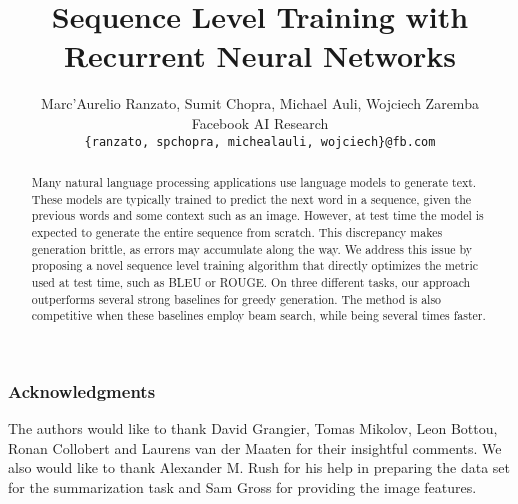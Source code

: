 \documentclass{article} %
\title{Sequence Level Training with\\Recurrent Neural Networks}
\author{Marc'Aurelio Ranzato, Sumit Chopra, Michael Auli, Wojciech Zaremba \\
Facebook AI Research\\
\texttt{\{ranzato, spchopra, michealauli, wojciech\}@fb.com}
}
\begin{document}
\maketitle


\begin{abstract}
Many natural language processing applications use language models to generate text.
These models are typically trained to predict the next word in a sequence, given the previous words and some context such as an image. 
However, at test time the model is expected to generate the entire sequence from scratch. 
This discrepancy makes generation brittle, as errors may accumulate along the way. 
We address this issue by proposing a novel sequence level training algorithm that directly optimizes the metric used at test time, such as BLEU or ROUGE.
On three different tasks, our approach outperforms several strong baselines for greedy generation. The method is also competitive when these baselines employ beam search,
 while being several times faster. 
\end{abstract}






\subsubsection*{Acknowledgments}
The authors would like to thank David Grangier, Tomas Mikolov, Leon Bottou, Ronan Collobert and Laurens van der Maaten for their insightful comments. 
We also would like to thank Alexander M. Rush for his help in preparing the data set for the summarization task and Sam Gross for providing the image features. 



\newpage

\end{document}
